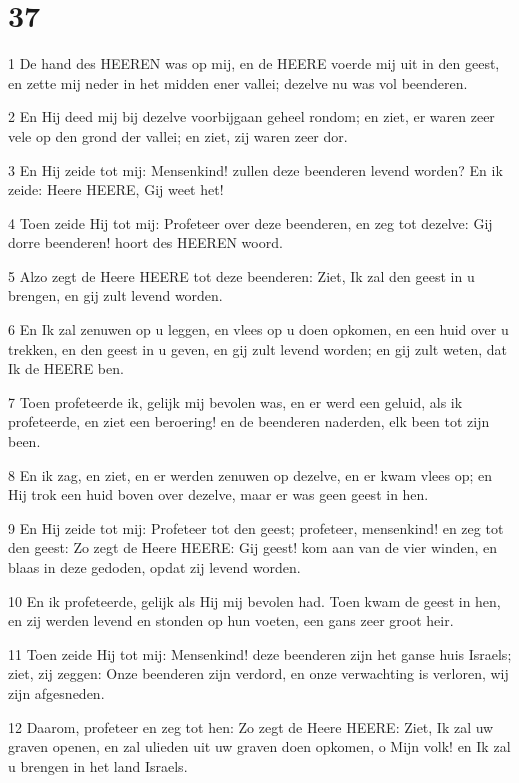 \chapter{37}

\par 1 De hand des HEEREN was op mij, en de HEERE voerde mij uit in den geest, en zette mij neder in het midden ener vallei; dezelve nu was vol beenderen.
\par 2 En Hij deed mij bij dezelve voorbijgaan geheel rondom; en ziet, er waren zeer vele op den grond der vallei; en ziet, zij waren zeer dor.
\par 3 En Hij zeide tot mij: Mensenkind! zullen deze beenderen levend worden? En ik zeide: Heere HEERE, Gij weet het!
\par 4 Toen zeide Hij tot mij: Profeteer over deze beenderen, en zeg tot dezelve: Gij dorre beenderen! hoort des HEEREN woord.
\par 5 Alzo zegt de Heere HEERE tot deze beenderen: Ziet, Ik zal den geest in u brengen, en gij zult levend worden.
\par 6 En Ik zal zenuwen op u leggen, en vlees op u doen opkomen, en een huid over u trekken, en den geest in u geven, en gij zult levend worden; en gij zult weten, dat Ik de HEERE ben.
\par 7 Toen profeteerde ik, gelijk mij bevolen was, en er werd een geluid, als ik profeteerde, en ziet een beroering! en de beenderen naderden, elk been tot zijn been.
\par 8 En ik zag, en ziet, en er werden zenuwen op dezelve, en er kwam vlees op; en Hij trok een huid boven over dezelve, maar er was geen geest in hen.
\par 9 En Hij zeide tot mij: Profeteer tot den geest; profeteer, mensenkind! en zeg tot den geest: Zo zegt de Heere HEERE: Gij geest! kom aan van de vier winden, en blaas in deze gedoden, opdat zij levend worden.
\par 10 En ik profeteerde, gelijk als Hij mij bevolen had. Toen kwam de geest in hen, en zij werden levend en stonden op hun voeten, een gans zeer groot heir.
\par 11 Toen zeide Hij tot mij: Mensenkind! deze beenderen zijn het ganse huis Israels; ziet, zij zeggen: Onze beenderen zijn verdord, en onze verwachting is verloren, wij zijn afgesneden.
\par 12 Daarom, profeteer en zeg tot hen: Zo zegt de Heere HEERE: Ziet, Ik zal uw graven openen, en zal ulieden uit uw graven doen opkomen, o Mijn volk! en Ik zal u brengen in het land Israels.
